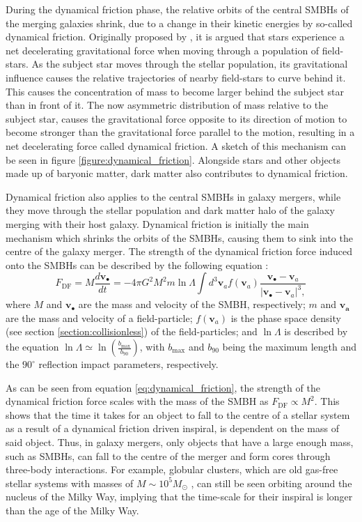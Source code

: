 \documentclass[english, twoside]{HYgradu}
\begin{document}
During the dynamical friction phase, the relative orbits of the central SMBHs of the merging galaxies shrink, due to a change in their kinetic energies by so-called dynamical friction. Originally proposed by \cite{Chandrasekhar1943}, it is argued that stars experience a net decelerating gravitational force when moving through a population of field-stars. As the subject star moves through the stellar population, its gravitational influence causes the relative trajectories of nearby field-stars to curve behind it. This causes the concentration of mass to become larger behind the subject star than in front of it. The now asymmetric distribution of mass relative to the subject star, causes the gravitational force opposite to its direction of motion to become stronger than the gravitational force parallel to the motion, resulting in a net decelerating force called dynamical friction. A sketch of this mechanism can be seen in figure \ref{figure:dynamical_friction}. Alongside stars and other objects made up of baryonic matter, dark matter also contributes to dynamical friction.

Dynamical friction also applies to the central SMBHs in galaxy mergers, while they move through the stellar population and dark matter halo of the galaxy merging with their host galaxy. Dynamical friction is initially the main mechanism which shrinks the orbits of the SMBHs, causing them to sink into the centre of the galaxy merger. The strength of the dynamical friction force induced onto the SMBHs can be described by the following equation \citep{BinneyTremaine}:
\begin{equation}
F_\mathrm{DF} = M\frac{d\mathbf{v_\bullet}}{dt} = -4\pi G^2 M^2 m \ln \Lambda \int d^3 \mathbf{v}_a f(\mathbf{v}_a) \frac{\mathbf{v_\bullet}-\mathbf{v}_a}{|\mathbf{v_\bullet}-\mathbf{v}_a|^3,} \label{eq:dynamical_friction}
\end{equation}
where $M$ and $\mathbf{v_\bullet}$ are the mass and velocity of the SMBH, respectively; $m$ and $\mathbf{v_a}$ are the mass and velocity of a field-particle; $f\left(\mathbf{v}_a\right)$ is the phase space density (see section \ref{section:collisionless}) of the field-particles; and $\ln \Lambda$ is described by the equation $\ln \Lambda \simeq \ln \left( \frac{b_\mathrm{max}}{b_{90}} \right)$, with $b_\mathrm{max}$ and $b_{90}$ being the maximum length and the $90^\circ$ reflection impact parameters, respectively.

As can be seen from equation \ref{eq:dynamical_friction}, the strength of the dynamical friction force scales with the mass of the SMBH as $F_\mathrm{DF} \propto M^2$. This shows that the time it takes for an object to fall to the centre of a stellar system as a result of a dynamical friction driven inspiral, is dependent on the mass of said object. Thus, in galaxy mergers, only objects that have a large enough mass, such as SMBHs, can fall to the centre of the merger and form cores through three-body interactions. For example, globular clusters, which are old gas-free stellar systems with masses of $M \sim 10^5 M_\odot$ \citep{BinneyTremaine}, can still be seen orbiting around the nucleus of the Milky Way, implying that the time-scale for their inspiral is longer than the age of the Milky Way.
\end{document}
